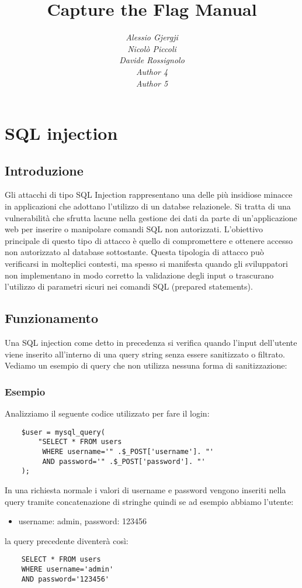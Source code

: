 \documentclass[oneside,a4paper,11pt]{book}
\title{Capture the Flag Manual}
\author{
\textit{Alessio Gjergji}\\
\textit{Nicolò Piccoli} \\
\textit{Davide Rossignolo} \\
\textit{Author 4} \\
\textit{Author 5}}
\date{}
\theoremstyle{italicstyle}
\theoremstyle{normStyle}
\begin{document}
\maketitle
\tableofcontents



\chapter{SQL injection}
\section{Introduzione}
Gli attacchi di tipo SQL Injection rappresentano una delle più insidiose minacce in applicazioni che adottano l'utilizzo di un databse relazionele. Si tratta di una vulnerabilità che sfrutta lacune nella gestione dei dati da parte di un'applicazione web per inserire o manipolare comandi SQL non autorizzati. L'obiettivo principale di questo tipo di attacco è quello di compromettere e ottenere accesso non autorizzato al database sottostante.
Questa tipologia di attacco può verificarsi in molteplici contesti, ma spesso si manifesta quando gli sviluppatori non implementano in modo corretto la validazione degli input o trascurano l'utilizzo di  parametri sicuri nei comandi SQL (prepared statements).

\section{Funzionamento}
Una SQL injection come detto in precedenza si verifica quando l'input dell'utente viene inserito all'interno di una query string senza essere sanitizzato o filtrato. Vediamo un esempio di query che non utilizza nessuna forma di sanitizzazione:

\subsection{Esempio}
Analizziamo il seguente codice utilizzato per fare il login:
\begin{lstlisting}
    $user = mysql_query(
        "SELECT * FROM users
         WHERE username='" .$_POST['username']. "'
         AND password='" .$_POST['password']. "'
    );
\end{lstlisting}
In una richiesta normale i valori di username e password vengono inseriti nella query tramite concatenazione di stringhe quindi se ad esempio abbiamo l'utente:
\begin{itemize}
    \item username: admin, password: 123456
\end{itemize}
la query precedente diventerà così:
\begin{lstlisting}
    SELECT * FROM users
    WHERE username='admin'
    AND password='123456'
\end{lstlisting}
\end{document}
